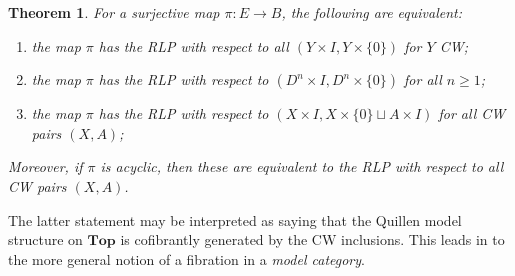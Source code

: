 \documentclass[11pt]{article}
\newtheorem{theorem}{Theorem}
\begin{document}
\begin{theorem}
For a surjective map $\pi: E \to B$, the following are equivalent:
\begin{enumerate}
\item the map $\pi$ has the RLP with respect to all $(Y \times I, Y \times \{0\})$ for $Y$ CW;
\item the map $\pi$ has the RLP with respect to $(D^n \times I, D^n \times \{0\})$ for all $n \geq 1$;
\item the map $\pi$ has the RLP with respect to $(X \times I, X\times \{0\} \sqcup A \times I)$ for all CW pairs $(X,A)$;
\end{enumerate}
Moreover, if $\pi$ is acyclic, then these are equivalent to the RLP with respect to all CW pairs $(X,A)$.
\end{theorem}

The latter statement may be interpreted as saying that the Quillen model structure on $\mathbf{Top}$ is cofibrantly generated by the CW inclusions. This leads in to the more general notion of a fibration in a \textit{model category}.
\end{document}
